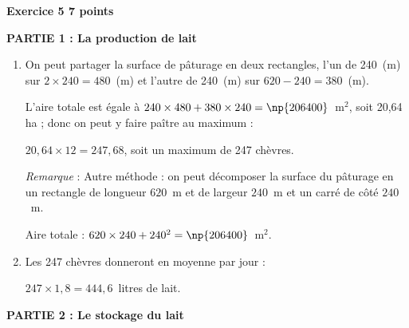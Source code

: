 \textbf{Exercice 5 \hfill 7 points}

\medskip

%
%
\textbf{PARTIE 1 : La production de lait}
%
%
%
%
%
%
%
%
%
%
%

\begin{enumerate}
\item %
On peut partager la surface de pâturage en deux rectangles, l’un de 240~(m) sur $2 \times 240 = 480$~(m) et l’autre de 240~(m) sur $620 - 240 = 380$~(m).

L’aire totale est égale à $240 \times 480 + 380 \times 240 = \np{206400}$~m$^2$, soit 20,64 ha ; donc on peut y faire paître au maximum :

$20,64 \times 12 = 247,68$, soit un maximum de 247 chèvres.

\emph{Remarque} : Autre méthode : on peut décomposer la surface du pâturage en un rectangle de longueur $620$~m et de largeur $240$~m et un carré de côté $240$~m.

Aire totale : $620 \times 240 + 240^2 = \np{206400}$~m$^2$.
\item %
Les 247 chèvres donneront en moyenne par jour :

$247 \times 1,8 = 444,6$~litres de lait.
\end{enumerate}

\bigskip
 
\textbf{PARTIE 2 : Le stockage du lait}
 

